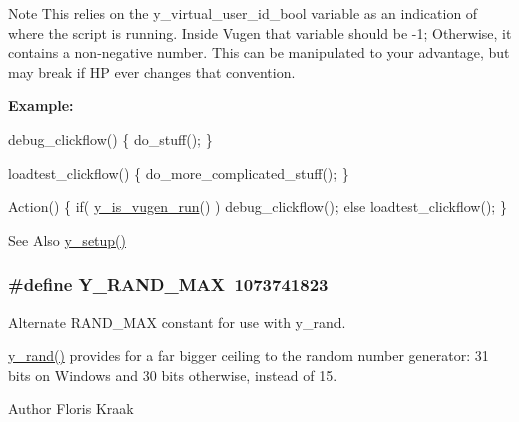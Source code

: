 \begin{DoxyNote}{Note}
This relies on the y\-\_\-virtual\-\_\-user\-\_\-id\-\_\-bool variable as an indication of where the script is running. Inside Vugen that variable should be -\/1; Otherwise, it contains a non-\/negative number. This can be manipulated to your advantage, but may break if H\-P ever changes that convention.
\end{DoxyNote}
{\bfseries Example\-:} 
\begin{DoxyCode}
debug\_clickflow()
\{
  do\_stuff();
\}

loadtest\_clickflow()
\{
   do\_more\_complicated\_stuff();
\}

Action()
\{
   \textcolor{keywordflow}{if}( \hyperlink{group__core_gaed34897cb0a5fb0ae18cf0d6facc35b5}{y\_is\_vugen\_run}() )
      debug\_clickflow();
   \textcolor{keywordflow}{else}
      loadtest\_clickflow();
\}
\end{DoxyCode}
 \begin{DoxySeeAlso}{See Also}
\hyperlink{group__core_ga7350ca6bb0383b2169ef4eaae3b091e7}{y\-\_\-setup()} 
\end{DoxySeeAlso}
\hypertarget{group__core_ga16db77ab873c5b767742a51c9613314b}{
\subsubsection[{Y\-\_\-\-R\-A\-N\-D\-\_\-\-M\-A\-X}]{\setlength{\rightskip}{0pt plus 5cm}\#define Y\-\_\-\-R\-A\-N\-D\-\_\-\-M\-A\-X~1073741823}}\label{group__core_ga16db77ab873c5b767742a51c9613314b}


Alternate R\-A\-N\-D\-\_\-\-M\-A\-X constant for use with y\-\_\-rand. 

\hyperlink{group__core_ga0419985b32761cce3f5d75e6aad36f05}{y\-\_\-rand()} provides for a far bigger ceiling to the random number generator\-: 31 bits on Windows and 30 bits otherwise, instead of 15. \begin{DoxyAuthor}{Author}
Floris Kraak 
\end{DoxyAuthor}


